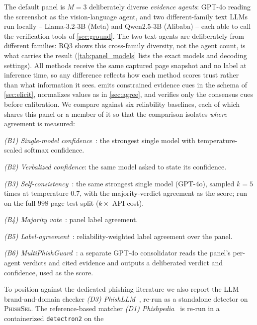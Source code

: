 The default panel is $M{=}3$ deliberately diverse \emph{evidence agents}: GPT-4o reading
the screenshot as the vision-language agent, and two different-family text LLMs run
locally -- Llama-3.2-3B (Meta) and Qwen2.5-3B (Alibaba) -- each able to call the
verification tools of \autoref{sec:ground}. The two text agents are deliberately from
different families: RQ3 shows this cross-family diversity, not the agent count, is what
carries the result (\autoref{tab:panel_models} lists the exact models and decoding
settings). All methods receive the same captured page snapshot and no
label at inference time, so any difference reflects how each method scores trust
rather than what information it sees. \toolname{} emits constrained evidence cues
in the schema of \autoref{sec:elicit}, normalizes values as in \autoref{sec:agree},
and verifies only the consensus cues before calibration. We compare against six
reliability baselines, each of which shares this panel or a member of it so that the
comparison isolates \emph{where} agreement is measured:
\begin{compactitem}
\item \emph{(B1) Single-model confidence}~\cite{guo2017calibration}: the strongest
single model with temperature-scaled softmax confidence.
\item \emph{(B2) Verbalized confidence}: the same model asked to state its
confidence.
\item \emph{(B3) Self-consistency}~\cite{wang2023selfconsistency}: the same strongest single
model (GPT-4o), sampled $k{=}5$ times at temperature $0.7$, with the majority-verdict
agreement as the score; run on the full $998$-page test split ($k\times$ API cost).
\item \emph{(B4) Majority vote}~\cite{ensembleornot2024}: panel label agreement.
\item \emph{(B5) Label-agreement}~\cite{dawid1979maximum}: reliability-weighted
label agreement over the panel.
\item \emph{(B6) MultiPhishGuard}~\cite{multiphishguard2025}: a separate GPT-4o
consolidator reads the panel's per-agent verdicts and cited evidence and outputs a
deliberated verdict and confidence, used as the score.
\end{compactitem}
To position \toolname{} against the dedicated phishing literature we also report the
LLM brand-and-domain checker \emph{(D3) PhishLLM}~\cite{tan2024phishllm}, re-run as a
standalone detector on \textsc{PhishSel}. The reference-based matcher \emph{(D1)
Phishpedia}~\cite{lin2021phishpedia} is re-run in a containerized \texttt{detectron2} on the
